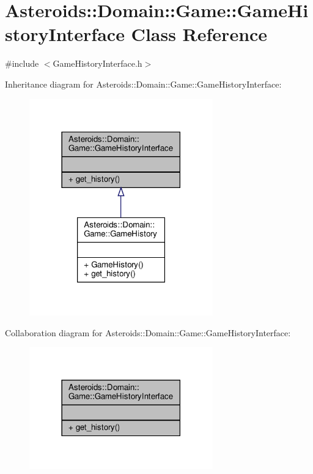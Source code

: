 \hypertarget{classAsteroids_1_1Domain_1_1Game_1_1GameHistoryInterface}{}\section{Asteroids\+:\+:Domain\+:\+:Game\+:\+:Game\+History\+Interface Class Reference}
\label{classAsteroids_1_1Domain_1_1Game_1_1GameHistoryInterface}


{\ttfamily \#include $<$Game\+History\+Interface.\+h$>$}



Inheritance diagram for Asteroids\+:\+:Domain\+:\+:Game\+:\+:Game\+History\+Interface\+:\nopagebreak
\begin{figure}[H]
\begin{center}
\leavevmode
\includegraphics[width=225pt]{classAsteroids_1_1Domain_1_1Game_1_1GameHistoryInterface__inherit__graph}
\end{center}
\end{figure}


Collaboration diagram for Asteroids\+:\+:Domain\+:\+:Game\+:\+:Game\+History\+Interface\+:\nopagebreak
\begin{figure}[H]
\begin{center}
\leavevmode
\includegraphics[width=225pt]{classAsteroids_1_1Domain_1_1Game_1_1GameHistoryInterface__coll__graph}
\end{center}
\end{figure}
